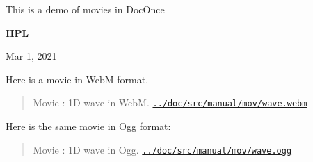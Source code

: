 \documentclass[%
oneside,                 %
final,                   %
10pt]{article}
\newenvironment{doconce:movie}{}{}
\newcounter{doconce:movie:counter}
\begin{document}

\newcommand{\exercisesection}[1]{\subsection*{#1}}








\thispagestyle{empty}

\begin{center}
{\LARGE\bf
\begin{spacing}{1.25}
This is a demo of movies in DocOnce
\end{spacing}
}
\end{center}


\begin{center}
{\bf HPL${}^{}$} \\ [0mm]
\end{center}

\begin{center}
\end{center}
    

\begin{center}
Mar 1, 2021
\end{center}

\vspace{1cm}


Here is a movie in WebM format.


\begin{doconce:movie}
\begin{quote}
Movie : 1D wave in WebM. \href{run:../doc/src/manual/mov/wave.webm}{\nolinkurl{../doc/src/manual/mov/wave.webm}}
\end{quote}
\end{doconce:movie}


Here is the same movie in Ogg format:


\begin{doconce:movie}
\begin{quote}
Movie : 1D wave in Ogg. \href{run:../doc/src/manual/mov/wave.ogg}{\nolinkurl{../doc/src/manual/mov/wave.ogg}}
\end{quote}
\end{doconce:movie}
\end{document}
